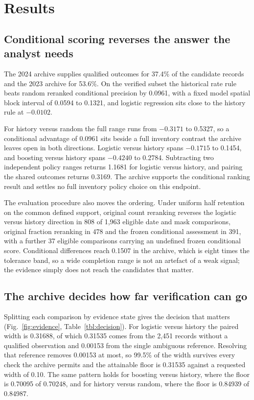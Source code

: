 \documentclass[a4paper,fleqn,longmktitle]{cas-sc}
\begin{document}
\section{Results}\label{sec:results}

\subsection{Conditional scoring reverses the answer the analyst needs}\label{sec:conditional}

The 2024 archive supplies qualified outcomes for 37.4\% of the candidate records and the 2023 archive for 53.6\%. On the verified subset the historical rate rule beats random reranked conditional precision by 0.0961, with a fixed model spatial block interval of 0.0594 to 0.1321, and logistic regression sits close to the history rule at \(-0.0102\).

For history versus random the full range runs from \(-0.3171\) to 0.5327, so a conditional advantage of 0.0961 sits beside a full inventory contrast the archive leaves open in both directions. Logistic versus history spans \(-0.1715\) to 0.1454, and boosting versus history spans \(-0.4240\) to 0.2784. Subtracting two independent policy ranges returns 1.1681 for logistic versus history, and pairing the shared outcomes returns 0.3169. The archive supports the conditional ranking result and settles no full inventory policy choice on this endpoint.

The evaluation procedure also moves the ordering. Under uniform half retention on the common defined support, original count reranking reverses the logistic versus history direction in 808 of 1,963 eligible date and mask comparisons, original fraction reranking in 478 and the frozen conditional assessment in 391, with a further 37 eligible comparisons carrying an undefined frozen conditional score. Conditional differences reach 0.1507 in the archive, which is eight times the tolerance band, so a wide completion range is not an artefact of a weak signal; the evidence simply does not reach the candidates that matter.

\subsection{The archive decides how far verification can go}\label{sec:floor}

Splitting each comparison by evidence state gives the decision that matters (Fig.~\ref{fig:evidence}, Table~\ref{tbl:decision}). For logistic versus history the paired width is 0.31688, of which 0.31535 comes from the 2,451 records without a qualified observation and 0.00153 from the single ambiguous reference. Resolving that reference removes 0.00153 at most, so 99.5\% of the width survives every check the archive permits and the attainable floor is 0.31535 against a requested width of 0.10. The same pattern holds for boosting versus history, where the floor is 0.70095 of 0.70248, and for history versus random, where the floor is 0.84939 of 0.84987.
\end{document}
